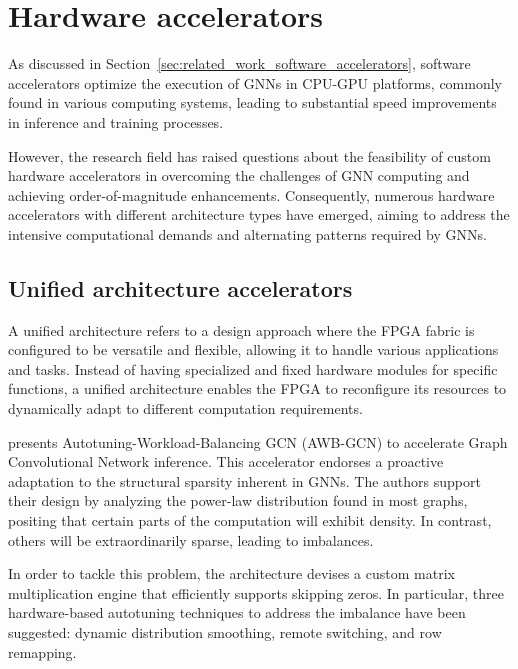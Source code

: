 \section{Hardware accelerators}
\label{sec:hardware_accelerators}%

As discussed in Section~\ref{sec:related_work_software_accelerators}, software accelerators optimize the execution of GNNs in CPU-GPU platforms, commonly found in various computing systems, leading to substantial speed improvements in inference and training processes.

However, the research field has raised questions about the feasibility of custom hardware accelerators in overcoming the challenges of GNN computing and achieving order-of-magnitude enhancements.
Consequently, numerous hardware accelerators with different architecture types have emerged, aiming to address the intensive computational demands and alternating patterns required by GNNs.

\subsection{Unified architecture accelerators}\label{subsec:unified-architecture-accelerators}%

A unified architecture refers to a design approach where the FPGA fabric is configured to be versatile and flexible, allowing it to handle various applications and tasks.
Instead of having specialized and fixed hardware modules for specific functions, a unified architecture enables the FPGA to reconfigure its resources to dynamically adapt to different computation requirements.

\cite{DBLP:journals/corr/abs-1908-10834} presents Autotuning-Workload-Balancing GCN (AWB-GCN) to accelerate Graph Convolutional Network inference.
This accelerator endorses a proactive adaptation to the structural sparsity inherent in GNNs. The authors support their design by analyzing the power-law distribution found in most graphs, positing that certain parts of the computation will exhibit density. In contrast, others will be extraordinarily sparse, leading to imbalances.

In order to tackle this problem, the architecture devises a custom matrix multiplication engine that efficiently supports skipping zeros.
In particular, three hardware-based autotuning techniques to address the imbalance have been suggested: dynamic distribution smoothing, remote switching, and row remapping.

